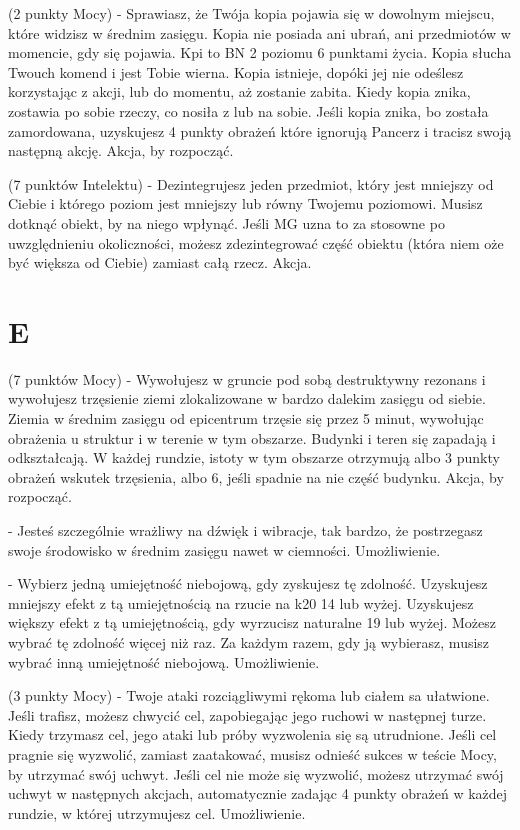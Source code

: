 { (2 punkty Mocy) - Sprawiasz, że Twója kopia pojawia się w dowolnym miejscu, które widzisz w średnim zasięgu. Kopia nie posiada ani ubrań, ani przedmiotów w momencie, gdy się pojawia. Kpi to BN 2 poziomu  6 punktami życia. Kopia słucha Twouch komend i jest Tobie wierna. Kopia istnieje, dopóki jej nie odeślesz korzystając z akcji, lub do momentu, aż zostanie zabita. Kiedy kopia znika, zostawia po sobie rzeczy, co nosiła z lub na sobie.  Jeśli kopia znika, bo została zamordowana, uzyskujesz 4 punkty obrażeń które ignorują Pancerz i tracisz swoją następną akcję. Akcja, by rozpocząć. 

 (7 punktów Intelektu) - Dezintegrujesz jeden przedmiot, który jest mniejszy od Ciebie i którego poziom jest mniejszy lub równy Twojemu poziomowi. Musisz dotknąć obiekt, by na niego wpłynąć. Jeśli MG uzna to za stosowne po uwzględnieniu okoliczności, możesz zdezintegrować część obiektu (która niem oże być większa od Ciebie) zamiast całą rzecz. Akcja.

\section{E}

 (7 punktów Mocy) - Wywołujesz w gruncie pod sobą destruktywny rezonans i wywołujesz trzęsienie ziemi zlokalizowane w bardzo dalekim zasięgu od siebie. Ziemia w średnim zasięgu od epicentrum trzęsie się przez 5 minut, wywołując obrażenia u struktur i w terenie w tym obszarze. Budynki i teren się zapadają i odkształcają. W każdej rundzie, istoty w tym obszarze otrzymują albo 3 punkty obrażeń wskutek trzęsienia, albo 6, jeśli spadnie na nie część budynku. Akcja, by rozpocząć.

  - Jesteś szczególnie wrażliwy na dźwięk i wibracje, tak bardzo, że postrzegasz swoje środowisko w średnim zasięgu nawet w ciemności. Umożliwienie.

 - Wybierz jedną umiejętność niebojową, gdy zyskujesz tę zdolność. Uzyskujesz mniejszy efekt z tą umiejętnością na rzucie na k20 14 lub wyżej. Uzyskujesz większy efekt z tą umiejętnością, gdy wyrzucisz naturalne 19 lub wyżej. Możesz wybrać tę zdolność więcej niż raz. Za każdym razem, gdy ją wybierasz, musisz wybrać inną umiejętność niebojową. Umożliwienie.

 (3 punkty Mocy) - Twoje ataki rozciągliwymi rękoma lub ciałem sa ułatwione. Jeśli trafisz, możesz chwycić cel, zapobiegając jego ruchowi w następnej turze. Kiedy trzymasz cel, jego ataki lub próby wyzwolenia się są utrudnione. Jeśli cel pragnie się wyzwolić, zamiast zaatakować, musisz odnieść sukces w teście Mocy, by utrzymać swój uchwyt. Jeśli cel nie może się wyzwolić, możesz utrzymać swój uchwyt w następnych akcjach, automatycznie zadając 4 punkty obrażeń w każdej rundzie, w której utrzymujesz cel. Umożliwienie.

}
